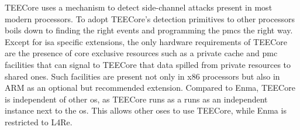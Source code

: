 TEECore uses a mechanism to detect side-channel attacks present in most modern
processors. To adopt TEECore's detection primitives to other processors boils
down to finding the right events and programming the \glspl{pmc} the right way.
Except for \gls{isa} specific extensions, the only hardware requirements of
TEECore are the presence of core exclusive resources such as a private cache and
\gls{pmc} facilities that can signal to TEECore that data spilled from private
resources to shared ones. Such facilities are present not only in x86 processors
but also in ARM as an optional but recommended extension. Compared to Enma,
TEECore is independent of other \gls{os}, as TEECore runs as a runs as
an independent instance next to the \gls{os}. This allows other \gls{os}es to
use TEECore, while Enma is restricted to L4Re.

